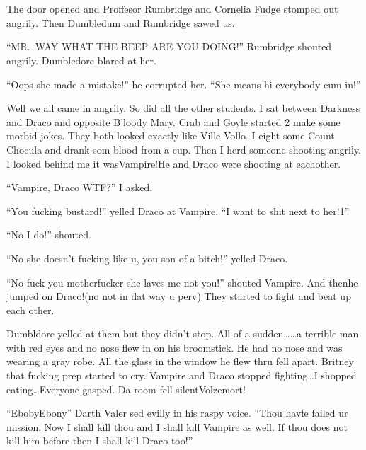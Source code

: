\section{}



The door opened and Proffesor Rumbridge and Cornelia Fudge stomped out angrily. Then Dumbledum and Rumbridge sawed us.

\enquote{MR.~WAY WHAT THE BEEP ARE YOU DOING\@!} Rumbridge shouted angrily. Dumbledore blared at her.

\enquote{Oops she made a mistake!} he corrupted her. \enquote{She means hi everybody cum in!}

Well we all came in angrily. So did all the other students. I sat between Darkness and Draco and opposite B'loody Mary. Crab and Goyle started 2 make some morbid jokes. They both looked exactly like Ville Vollo. I eight some Count Chocula and drank som blood from a cup. Then I herd someone shooting angrily. I looked behind me it was\dotfill Vampire!\newline He and Draco were shooting at eachother.

\enquote{Vampire, Draco WTF?} I asked.

\enquote{You fucking bustard!} yelled Draco at Vampire. \enquote{I want to shit next to her!1}

\enquote{No I do!} shouted.

\enquote{No she doesn't fucking like u, you son of a bitch!} yelled Draco.

\enquote{No fuck you motherfucker she laves me not you!} shouted Vampire. And then\dotfill he jumped on Draco!\newline (no not in dat way u perv) They started to fight and beat up each other.

Dumbldore yelled at them but they didn't stop. All of a sudden\ldots\ldots a terrible man with red eyes and no nose flew in on his broomstick. He had no nose and was wearing a gray robe. All the glass in the window he flew thru fell apart. Britney that fucking prep started to cry. Vampire and Draco stopped fighting\ldots I shopped eating\ldots Everyone gasped. Da room fell silent\dotfill\newline\phantom{}\dotfill Volzemort!

\enquote{Eboby\dotfill Ebony\dotfill} Darth Valer sed evilly in his raspy voice. \enquote{Thou havfe failed ur mission. Now I shall kill thou and I shall kill Vampire as well. If thou does not kill him before then I shall kill Draco too!}

